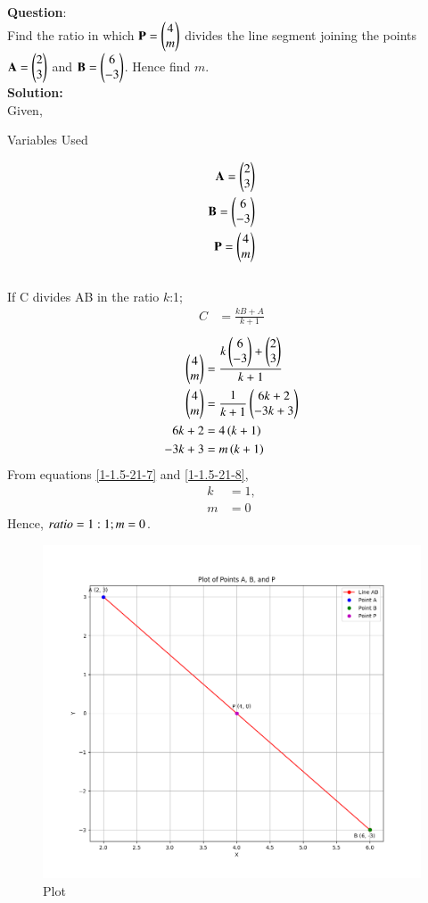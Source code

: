 \documentclass[journal]{IEEEtran}
\begin{document}
\textbf{Question}:\\
Find the ratio in which $\mathbf{P}=\begin{pmatrix}4\\m\end{pmatrix}$ divides the line segment joining the points $\mathbf{A}=\begin{pmatrix}2\\3\end{pmatrix}$ and $\mathbf{B}=\begin{pmatrix}6\\-3\end{pmatrix}$. Hence find $m$.
\\
\textbf{Solution: }\\
Given,\begin{table}[h!]    
  \centering
  
  \caption{Variables Used}
  \label{1-1.5-21-table}
\end{table}
 \begin{align}
\mathbf{A}=\begin{pmatrix}2\\3\end{pmatrix}\label{1-1.5-21-1}\\
\mathbf{B}=\begin{pmatrix}6\\-3\end{pmatrix}\label{1-1.5-21-2}\\
\mathbf{P}=\begin{pmatrix}4\\m\end{pmatrix}\label{1-1.5-21-3}
\end{align}
\\
If C divides AB in the ratio $k$:1; 
\begin{align}
C&= \frac{kB+A}{k+1}\label{1-1.5-21-4}
\end{align}
\begin{align}
\begin{pmatrix}4\\m\end{pmatrix}&=\frac{k\begin{pmatrix}6\\-3\end{pmatrix}+\begin{pmatrix}2\\3\end{pmatrix}}{k+1}\label{1-1.5-21-5}\\
\begin{pmatrix}4\\m\end{pmatrix}&=\frac{1}{k+1}\begin{pmatrix}6k+2\\-3k+3\end{pmatrix}\label{1-1.5-21-6}\\
6k+2&=4\left(k+1\right)\label{1-1.5-21-7}\\
-3k+3&=m\left(k+1\right)\label{1-1.5-21-8}
\end{align}
   From equations \eqref{1-1.5-21-7} and \eqref{1-1.5-21-8}, 
\begin{align}
k&=1,\\
m&=0
\end{align}
Hence, $ratio=1:1;\\
m=0$.
\begin{figure}[h!]
   \centering
   \includegraphics[width=1\linewidth]{fig/Fig.png}
   \caption{Plot}
   \label{1-1.5-21-fig-1}
\end{figure}
\end{document}
